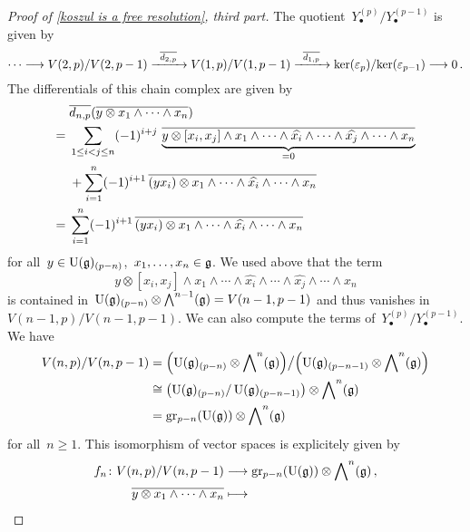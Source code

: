 \begin{proof}[Proof of \cref{koszul is a free resolution}, third part]
  The quotient~$Y^{(p)}_\bullet / Y^{(p-1)}_\bullet$ is given by
  \[
    \dotsb
    \to
    V(2,p) / V(2, p-1)
    \xto{\induced{d_{2,p}}}
    V(1,p) / V(1, p-1)
    \xto{\induced{d_{1,p}}}
    \ker(\varepsilon_p) / {\ker(\varepsilon_{p-1})}
    \to
    0 \,.
  \]
  The differentials of this chain complex are given by
  \begin{align*}
    {}&
    \overline{d_{n,p}}( \overline{y \otimes x_1 \wedge \dotsb \wedge x_n} )
    \\
    ={}&
    \sum_{1 \leq i < j \leq n}
    (-1)^{i+j}
    \,
    \underbrace{
      \overline{
        y \otimes [x_i, x_j] \wedge x_1 \wedge \dotsb \wedge \widehat{x_i} \wedge \dotsb \wedge \widehat{x_j} \wedge \dotsb \wedge x_n
      }
    }_{=0}
    \\
    {}&
    +
    \sum_{i=1}^n
    (-1)^{i+1}
    \,
    \overline{ (y x_i) \otimes x_1 \wedge \dotsb \wedge \widehat{x_i} \wedge \dotsb \wedge x_n }
    \\
    ={}&
    \sum_{i=1}^n
    (-1)^{i+1}
    \,
    \overline{ (y x_i) \otimes x_1 \wedge \dotsb \wedge \widehat{x_i} \wedge \dotsb \wedge x_n }
  \end{align*}
  for all~$y \in \operatorname{U}(\mathfrak{g})_{(p-n)}$,~$x_1, \dotsc, x_n \in \mathfrak{g}$.
  We used above that the term
  \[
    y \otimes [x_i,x_j] \wedge x_1 \wedge \dotsb \wedge \widehat{x_i} \wedge \dotsb \wedge \widehat{x_j} \wedge \dotsb \wedge x_n
  \]
  is contained in~$\operatorname{U}(\mathfrak{g})_{(p-n)} \otimes \operatorname{\bigwedge}^{n-1}(\mathfrak{g}) = V(n-1,p-1)$ and thus vanishes in~$V(n-1,p) / V(n-1, p-1)$.
  We can also compute the terms of~$Y^{(p)}_\bullet / Y^{(p-1)}_\bullet$.
  We have
  \begin{align*}
    V(n, p) / V(n, p-1)
    &=
    \Bigl(
      \Univ(\glie)_{(p-n)} \otimes \Exterior^n(\glie)
    \Bigr)
    \big/
    \Bigl(
      \Univ(\glie)_{(p-n-1)} \otimes \Exterior^n(\glie)
    \Bigr)
    \\
    &\cong
    \bigl(
      \Univ(\glie)_{(p-n)} / \Univ(\glie)_{(p-n-1)}
    \bigr)
    \otimes
    \Exterior^n(\glie)
    \\
    &=
    \gr[p-n]( \Univ(\glie) )
    \otimes
    \Exterior^n(\glie)
  \end{align*}
  for all~$n \geq 1$.
  This isomorphism of vector spaces is explicitely given by
  \begin{align*}
    f_n
    \colon
    V(n, p) / V(n, p-1)
    &\to
    \gr[p-n]( \Univ(\glie) )
    \otimes
    \Exterior^n(\glie) \,,
    \\
    \class{ y \otimes x_1 \wedge \dotsb \wedge x_n }
    &\mapsto

\end{align*}
\end{proof}
